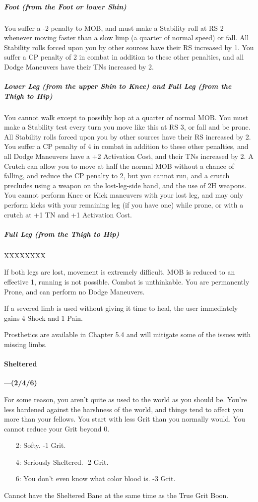 \documentclass[oneside,11pt,english]{book}
\begin{document}
\subparagraph*{Foot (from the Foot or lower Shin)}
You suffer a -2 penalty to MOB, and must make a Stability roll at RS 2 whenever moving faster 
than a slow limp (a quarter of normal speed) or fall. All Stability rolls forced upon you by other 
sources have their RS increased by 1. You suffer a CP penalty of 2 in combat in addition to these 
other penalties, and all Dodge Maneuvers have their TNs increased by 2. 
\subparagraph*{Lower Leg (from the upper Shin to Knee) and Full Leg (from the Thigh to Hip)}
You cannot walk except to possibly hop at a quarter of normal MOB. You must make a Stability 
test every turn you move like this at RS 3, or fall and be prone. All Stability rolls forced upon you 
by other sources have their RS increased by 2. You suffer a CP penalty of 4 in combat in addition 
to these other penalties, and all Dodge Maneuvers have a +2 Activation Cost, and their TNs 
increased by 2. A Crutch can allow you to move at half the normal MOB without a chance of 
falling, and reduce the CP penalty to 2, but you cannot run, and a crutch precludes using a 
weapon on the lost-leg-side hand, and the use of 2H weapons. You cannot perform Knee or Kick 
maneuvers with your lost leg, and may only perform kicks with your remaining leg (if you have 
one) while prone, or with a crutch at +1 TN and +1 Activation Cost. 
\subparagraph*{Full Leg (from the Thigh to Hip)}
XXXXXXXX


If both legs are lost, movement is extremely difficult. MOB is reduced to an effective 1, running 
is not possible. Combat is unthinkable. You are permanently Prone, and can perform no Dodge 
Maneuvers. 


If a severed limb is used without giving it time to heal, the user immediately gains 4 Shock and 1 Pain.


Prosthetics are available in Chapter 5.4 and will mitigate some of the issues with missing limbs.%
\paragraph{\label{bane:Sheltered}Sheltered}---\quad\textbf{(2/4/6) }\par
For some reason, you aren’t quite as used to the world as you should be. You’re less hardened against the 
harshness of the world, and things tend to affect you more than your fellows. You start with less Grit than 
you normally would. You cannot reduce your Grit beyond 0. 
\begin{itemize}
	\item [2:] Softy. -1 Grit.
	\item [4:] Seriously Sheltered. -2 Grit.
	\item [6:]You don’t even know what color blood is. -3 Grit.
\end{itemize}
Cannot have the Sheltered Bane at the same time as the True Grit Boon. 
\end{document}
